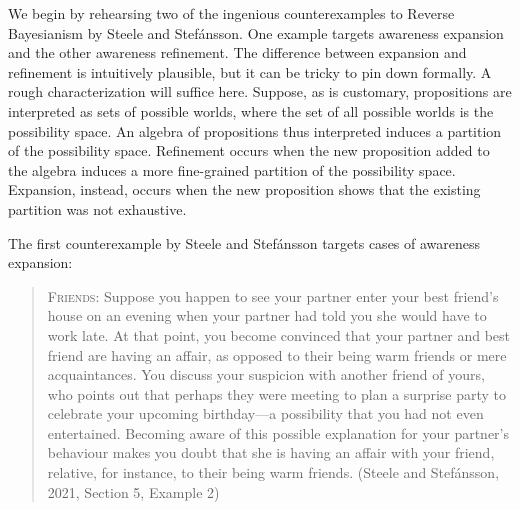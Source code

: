 \documentclass[
  11pt,
  dvipsnames,enabledeprecatedfontcommands]{scrartcl}
\begin{document}
\label{sec:counterexamples} \label{sec:better}

We begin by rehearsing two of the ingenious counterexamples to Reverse
Bayesianism by Steele and Stefánsson. One example targets awareness
expansion and the other awareness refinement. The difference between
expansion and refinement is intuitively plausible, but it can be tricky
to pin down formally. A rough characterization will suffice here.
Suppose, as is customary, propositions are interpreted as sets of
possible worlds, where the set of all possible worlds is the possibility
space. An algebra of propositions thus interpreted induces a partition
of the possibility space. Refinement occurs when the new proposition
added to the algebra induces a more fine-grained partition of the
possibility space. Expansion, instead, occurs when the new proposition
shows that the existing partition was not exhaustive.

The first counterexample by Steele and Stefánsson targets cases of
awareness expansion:

\begin{quote}
\textsc{Friends}: Suppose you happen to see your partner enter your best
friend's house on an evening when your partner had told you she would
have to work late. At that point, you become convinced that your partner
and best friend are having an affair, as opposed to their being warm
friends or mere acquaintances. You discuss your suspicion with another
friend of yours, who points out that perhaps they were meeting to plan a
surprise party to celebrate your upcoming birthday---a possibility that
you had not even entertained. Becoming aware of this possible
explanation for your partner's behaviour makes you doubt that she is
having an affair with your friend, relative, for instance, to their
being warm friends. (Steele and Stefánsson, 2021, Section 5, Example 2)
\end{quote}
\end{document}
